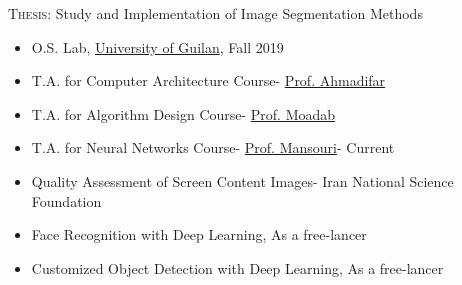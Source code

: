 \documentclass[10pt,a4paper]{altacv}
\begin{document}
\textsc{Thesis}: {Study and Implementation of Image Segmentation Methods}




	\begin{itemize}
		\item O.S. Lab, \href{https://guilan.ac.ir/en/home}{University of Guilan}, Fall 2019

		\item T.A. for Computer Architecture Course- \href{https://scholar.google.com/citations?user=WT1Jve8AAAAJ&hl=en}{Prof. Ahmadifar}

		\item T.A. for Algorithm Design Course- \href{https://www.linkedin.com/in/shahram-moadab-94b79253/?originalSubdomain=ir}{Prof. Moadab}

		\item T.A. for Neural Networks Course- \href{https://scholar.google.com/citations?user=eK03yPgAAAAJ}{Prof. Mansouri}- Current
	\end{itemize}
	\begin{itemize}
		\item Quality Assessment of Screen Content Images- Iran National Science Foundation

		\item Face Recognition with Deep Learning, As a free-lancer

		\item Customized Object Detection with Deep Learning, As a free-lancer
	\end{itemize}
 
\end{document}
